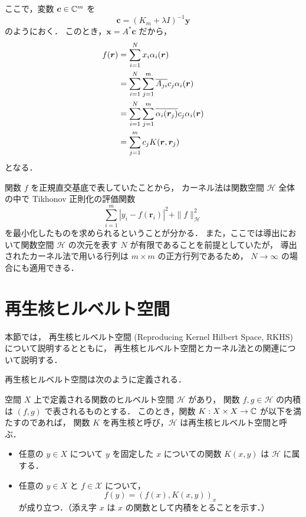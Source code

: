 ここで，変数 $\bm{c} \in \mathbb{C}^m$ を
\begin{equation}
    \bm{c} = (K_m + \lambda I)^{-1} \bm{y}
    \label{eq:interp_kernel_tikhonov_coeff_c}
\end{equation}
のようにおく．
このとき，$\bm{x} = A^* \bm{c}$ だから，
\begin{align}
    f(\bm{r})
     & = \sum_{i = 1}^{N} x_i \alpha_i(\bm{r}) \notag                                                \\
     & = \sum_{i = 1}^{N} \sum_{j = 1}^{m} \overline{A_{ji}} c_j \alpha_i(\bm{r}) \notag             \\
     & = \sum_{i = 1}^{N} \sum_{j = 1}^{m} \overline{\alpha_i(\bm{r}_j)} c_j \alpha_i(\bm{r}) \notag \\
     & = \sum_{j = 1}^{m} c_j K(\bm{r}, \bm{r}_j)
\end{align}
となる．

関数 $f$ を正規直交基底で表していたことから，
カーネル法は関数空間 $\mathcal{H}$ 全体の中で Tikhonov 正則化の評価関数
\begin{equation}
    \sum_{i=1}^m \left|y_i - f(\bm{r}_i)\right|^2
    + \|f\|_{\mathcal{H}}^2
\end{equation}
を最小化したものを求められるということが分かる．
また，ここでは導出において関数空間 $\mathcal{H}$ の次元を表す $N$ が有限であることを前提としていたが，
導出されたカーネル法で用いる行列は $m \times m$ の正方行列であるため，
$N \to \infty$ の場合にも適用できる．

\section{再生核ヒルベルト空間}\label{sec:interp_kernel_rkhs}

本節では，
再生核ヒルベルト空間 (Reproducing Kernel Hilbert Space, RKHS)
について説明するとともに，
再生核ヒルベルト空間とカーネル法との関連について説明する．

再生核ヒルベルト空間は次のように定義される．

\begin{definition}
    空間 $X$ 上で定義される関数のヒルベルト空間 $\mathcal{H}$ があり，
    関数 $f, g \in \mathcal{H}$ の内積は $(f, g)$ で表されるものとする．
    このとき，関数 $K : X \times X \to \mathbb{C}$ が以下を満たすのであれば，
    関数 $K$ を再生核と呼び，$\mathcal{H}$ は再生核ヒルベルト空間と呼ぶ．
    \begin{itemize}
        \item 任意の $y \in X$ について $y$ を固定した $x$ についての関数 $K(x,y)$ は
              $\mathcal{H}$ に属する．
        \item 任意の $y \in X$ と $f \in \mathcal{X}$ について，
              \begin{equation}
                  f(y) = (f(x), K(x, y))_x
              \end{equation}
              が成り立つ．（添え字 $x$ は $x$ の関数として内積をとることを示す．）
    \end{itemize}
\end{definition}

